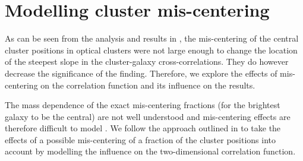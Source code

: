 \documentclass[iop, apjl, twocolappendix, numberedappendix]{emulateapj}
\begin{document}
\section{Modelling cluster mis-centering}
\label{sec:mis-centering}
As can be seen from the analysis and results in \citet{baxter2017halo},
the mis-centering of the central cluster positions in optical clusters
were not large enough to change the location of the steepest slope in
the cluster-galaxy cross-correlations. They do however decrease the
significance of the finding. Therefore, we explore the effects of
mis-centering on the correlation function and its influence on the
results. 

The mass dependence of the exact mis-centering fractions (for the
brightest galaxy to be the central) are not well understood and
mis-centering effects are therefore difficult to model
\citep{Skibba:2011, Hoshino:2015}. We follow the approach outlined in
\citet{baxter2017halo} to take the effects of a possible mis-centering
of a fraction of the cluster positions into account by modelling the
influence on the two-dimensional correlation function.
\end{document}
